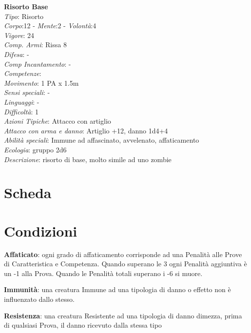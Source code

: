 \documentclass[12pt,a4paper,twoside,openany]{book}
\begin{document}
\begin{multicols}{2}
\textbf{Risorto Base}\\
\textit{Tipo}: Risorto\\
\textit{Corpo}:12 - \textit{Mente}:2 - \textit{Volontà}:4\\
\textit{Vigore}:  24 \\ %
\textit{Comp. Armi}: Rissa 8\\
\textit{Difesa}: -\\
\textit{Comp Incantamento}: -\\
\textit{Competenze}: \\
\textit{Movimento}: 1 PA x 1.5m\\
\textit{Sensi speciali}: -\\
\textit{Linguaggi}: -\\
\textit{Difficoltà}: 1\\
\textit{Azioni Tipiche}: Attacco con artiglio\\
\textit{Attacco con arma e danno}: Artiglio +12, danno 1d4+4\\
\textit{Abilità speciali}: Immune ad affascinato, avvelenato, affaticamento	\\
\textit{Ecologia}: gruppo 2d6\\
\textit{Descrizione}: risorto di base, molto simile ad uno zombie\\

\end{multicols}

\pagebreak

\section{Scheda}

\pagebreak

\section{Condizioni}

\textbf{Affaticato}: ogni grado di affaticamento corrisponde ad una Penalità alle Prove di Caratteristica e Competenza. Quando superano le 3 ogni Penalità aggiuntiva è un -1 alla Prova.
Quando le Penalità totali superano i -6 si muore.

\textbf{Immunità}: una creatura Immune ad una tipologia di danno o effetto non è influenzato dallo stesso.

\textbf{Resistenza}: una creatura Resistente ad una tipologia di danno dimezza, prima di qualsiasi Prova, il danno ricevuto dalla stessa tipo 
\end{document}
